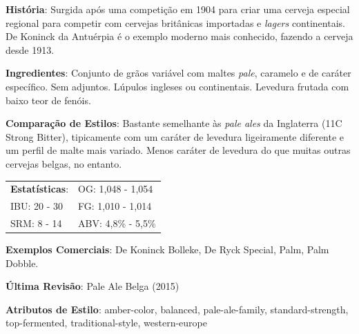 \textbf{História}: Surgida após uma competição em 1904 para criar uma cerveja especial regional para competir com cervejas britânicas importadas e \textit{lagers} continentais. De Koninck da Antuérpia é o exemplo moderno mais conhecido, fazendo a cerveja desde 1913.

\textbf{Ingredientes}: Conjunto de grãos variável com maltes \textit{pale}, caramelo e de caráter específico. Sem adjuntos. Lúpulos ingleses ou continentais. Levedura frutada com baixo teor de fenóis.

\textbf{Comparação de Estilos}: Bastante semelhante às \textit{pale ales} da Inglaterra (11C Strong Bitter), tipicamente com um caráter de levedura ligeiramente diferente e um perfil de malte mais variado. Menos caráter de levedura do que muitas outras cervejas belgas, no entanto.

\begin{tabular}{@{}p{35mm}p{35mm}@{}}
  \textbf{Estatísticas}: & OG: 1,048 - 1,054 \\
  IBU: 20 - 30  & FG: 1,010 - 1,014  \\
  SRM: 8 - 14  & ABV: 4,8\% - 5,5\%
\end{tabular}

\textbf{Exemplos Comerciais}: De Koninck Bolleke, De Ryck Special, Palm, Palm Dobble.

\textbf{Última Revisão}: Pale Ale Belga (2015)

\textbf{Atributos de Estilo}: amber-color, balanced, pale-ale-family, standard-strength, top-fermented, traditional-style, western-europe